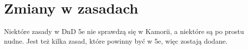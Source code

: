 \chapter{Zmiany w zasadach}
Niektóre zasady w DnD 5e nie sprawdzą się w Kamorii, a niektóre są po prostu
nudne. Jest też kilka zasad, które powinny być w 5e, więc zostają dodane.





